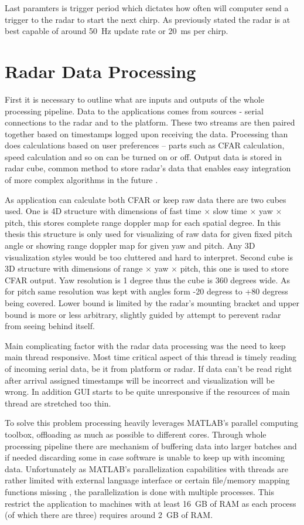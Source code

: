 Last paramters is trigger period which dictates how often will computer send a trigger to the radar to start the next chirp.
As previously stated the radar is at best capable of around 50~Hz update rate or 20~ms per chirp.


\chapter{Radar Data Processing}

First it is necessary to outline what are inputs and outputs of the whole processing pipeline.
Data to the applications comes from sources - serial connections to the radar and to the platform.
These two streams are then paired together based on timestamps logged upon receiving the data.
Processing than does calculations based on user preferences -- parts such as CFAR calculation, speed calculation and so on can be turned on or off.
Output data is stored in radar cube, common method to store radar's data that enables easy integration of more complex algorithms in the future \cite{richards2022}.

As application can calculate both CFAR or keep raw data there are two cubes used.
One is 4D structure with dimensions of fast time $\times$ slow time $\times$ yaw $\times$ pitch, this stores complete range doppler map for each spatial degree.
In this thesis this structure is only used for visualizing of raw data for given fixed pitch angle or showing range doppler map for given yaw and pitch.
Any 3D visualization styles would be too cluttered and hard to interpret.
Second cube is 3D structure with dimensions of range $\times$ yaw $\times$ pitch, this one is used to store CFAR output.
Yaw resolution is 1 degree thus the cube is 360 degrees wide.
As for pitch same resolution was kept with angles form -20 degress to +80 degress being covered.
Lower bound is limited by the radar's mounting bracket and upper bound is more or less arbitrary, slightly guided by attempt to perevent radar from seeing behind itself.

Main complicating factor with the radar data processing was the need to keep main thread responsive.
Most time critical aspect of this thread is timely reading of incoming serial data, be it from platform or radar.
If data can't be read right after arrival assigned timestamps will be incorrect and visualization will be wrong.
In addition GUI starts to be quite unresponsive if the resources of main thread are stretched too thin.

To solve this problem processing heavily leverages MATLAB's parallel computing toolbox, offloading as much as possible to different cores.
Through whole processing pipeline there are mechanism of buffering data into larger batches and if needed discarding some in case software is unable to keep up with incoming data.
Unfortunately as MATLAB's parallelization capabilities with threads are rather limited with external language interface or certain file/memory mapping functions missing \cite{matlabParallel}, the parallelization is done with multiple processes.
This restrict the application to machines with at least 16~GB of RAM as each process (of which there are three) requires around 2~GB of RAM.

